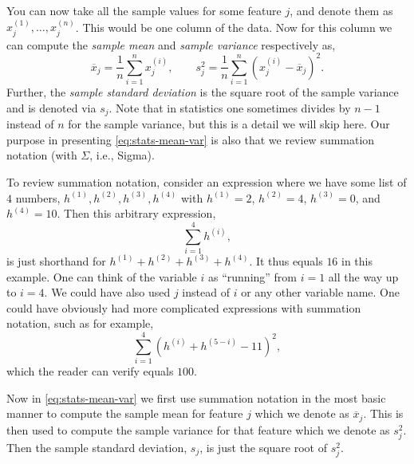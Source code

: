 \documentclass[12pt]{article}
\begin{document}
You can now take all the sample values for some feature $j$, and denote them as $x_j^{(1)}, \ldots, x_j^{(n)}$. This would be one column of the data.  
Now for this column we can compute the \textit{sample mean} and \textit{sample variance} respectively as,
%
\begin{equation}
\label{eq:stats-mean-var}
\overline{x}_j = \frac{1}{n} \sum_{i=1}^n x_j^{(i)},
\qquad
s^2_j = \frac{1}{n} \sum_{i=1}^n (x_j^{(i)} - \overline{x}_j)^2.
\end{equation}
%
Further, the \textit{sample standard deviation} is the square root of the sample variance and is denoted via $s_j$. Note that in statistics one sometimes divides by $n-1$ instead of $n$ for the sample variance, but this is a detail we will skip here. Our purpose in presenting \eqref{eq:stats-mean-var} is also that we review summation notation (with $\Sigma$, i.e., Sigma).

To review summation notation, consider an expression where we have some list of $4$ numbers, $h^{(1)}, h^{(2)}, h^{(3)}, h^{(4)}$ with $h^{(1)} = 2$, $h^{(2)} = 4$, $h^{(3)} = 0$, and $h^{(4)} = 10$. Then this arbitrary expression,
%
\begin{equation}
\label{eq:4-summation}
\sum_{i=1}^4 h^{(i)},
\end{equation}
%
is just shorthand for $h^{(1)} +h^{(2)} +h^{(3)} +h^{(4)}$. It thus equals $16$ in this example. One can think of the variable $i$ as ``running'' from $i=1$ all the way up to $i=4$. We could have also used $j$ instead of $i$ or any other variable name. One could have obviously had more complicated expressions with summation notation, such as for example,
%
\begin{equation}
\label{eq:4-summation-advc}
\sum_{i=1}^4 (h^{(i)} +h^{(5-i)} - 11)^2,
\end{equation}
%
which the reader can verify equals $100$.

Now in \eqref{eq:stats-mean-var} we first use summation notation in the most basic manner to compute the sample mean for feature $j$ which we denote as $\overline{x}_j$. This is then used to compute the sample variance for that feature which we denote as $s_j^2$. Then the sample standard deviation, $s_j$, is just the square root of $s_j^2$.
\end{document}
